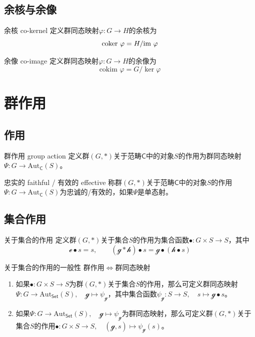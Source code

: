 \subsection{余核与余像}

\begin{definition}{余核 co-kernel}
	定义群同态映射$\varphi:G\to H$的余核为
	$$
	\text{coker }\varphi=H/\text{im } \varphi
	$$
\end{definition}

\begin{definition}{余像 co-image}
	定义群同态映射$\varphi:G\to H$的余像为
	$$
	\text{cokim }\varphi=G/\ker\varphi
	$$
\end{definition}

\section{群作用}

\subsection{作用}

\begin{definition}{群作用 group action}
	定义群$(G,*)$关于范畴$\mathsf{C}$中的对象$S$的作用为群同态映射$\Psi:G\to \mathrm{Aut}_{\mathsf{C}}(S)$。
\end{definition}

\begin{definition}{忠实的 faithful / 有效的 effective}
	称群$(G,*)$关于范畴$\mathsf{C}$中的对象$S$的作用$\Psi:G\to \mathrm{Aut}_{\mathsf{C}}(S)$为忠诚的/有效的，如果$\Psi$是单态射。
\end{definition}

\subsection{集合作用}

\begin{definition}{关于集合的作用}
	定义群$(G,*)$关于集合$S$的作用为集合函数$\bullet:G\times S\to S$，其中
	$$
	\mathcal{e}\bullet s=s,\qquad
	(\mathcal{g}*\mathcal{h})\bullet s=\mathcal{g}\bullet(\mathcal{h}\bullet s)
	$$
\end{definition}

\begin{definition}{关于集合的作用的一般性}
	群作用$\iff$群同态映射
	\begin{enumerate}
		\item 如果$\bullet:G\times S\to S$为群$(G,*)$关于集合$S$的作用，那么可定义群同态映射$\Psi:G\to \mathrm{Aut}_{\mathsf{Set}}(S),\quad \mathcal{g}\mapsto \psi_{\mathcal{g}}$，其中集合函数$\psi_{\mathcal{g}}:S\to S,\quad s\mapsto \mathcal{g}\bullet s$。
		\item 如果$\Psi:G\to \mathrm{Aut}_{\mathsf{Set}}(S),\quad \mathcal{g}\mapsto \psi_{\mathcal{g}}$为群同态映射，那么可定义群$(G,*)$关于集合$S$的作用$\bullet:G\times S\to S,\quad (\mathcal{g},s)\mapsto \psi_{\mathcal{g}}(s)$。
	\end{enumerate}
\end{definition}

